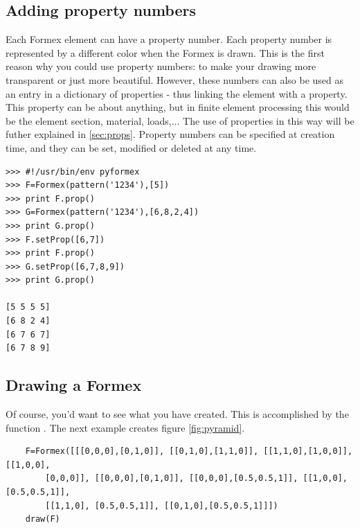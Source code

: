 {\subsection{Adding property numbers}
\label{subsec:propnr}
Each Formex element can have a property number. Each property number is represented by a different color when the Formex is drawn. This is the first reason why you could use property numbers: to make your drawing more transparent or just more beautiful. However, these numbers can also be used as an entry in a dictionary of properties - thus linking the element with a property. This property can be about anything, but in finite element processing this would be the element section, material, loads,... The use of properties in this way will be futher explained in \ref{sec:props}.
Property numbers can be specified at creation time, and they can be set, modified or deleted at any time.  
\begin{verbatim}
>>> #!/usr/bin/env pyformex
>>> F=Formex(pattern('1234'),[5])
>>> print F.prop()
>>> G=Formex(pattern('1234'),[6,8,2,4])
>>> print G.prop()
>>> F.setProp([6,7])
>>> print F.prop()
>>> G.setProp([6,7,8,9])
>>> print G.prop()

[5 5 5 5]
[6 8 2 4]
[6 7 6 7]
[6 7 8 9]
\end{verbatim}

\subsection{Drawing a Formex}
\label{subsec:drawing}
Of course, you'd want to see what you have created. This is accomplished by the function . The next example creates figure \ref{fig:pyramid}. 
\begin{verbatim}
	F=Formex([[[0,0,0],[0,1,0]], [[0,1,0],[1,1,0]], [[1,1,0],[1,0,0]], [[1,0,0], 
		[0,0,0]], [[0,0,0],[0,1,0]], [[0,0,0],[0.5,0.5,1]], [[1,0,0],[0.5,0.5,1]], 
		[[1,1,0], [0.5,0.5,1]], [[0,1,0],[0.5,0.5,1]]])
	draw(F)
\end{verbatim}

}
